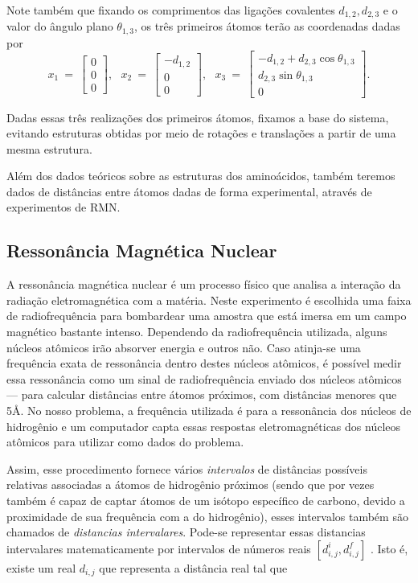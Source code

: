 \documentclass[a4paper,12pt]{article}
\begin{document}
	Note também que fixando os comprimentos das ligações covalentes $d_{1,2},d_{2,3}$ e o valor do ângulo plano $\theta_{1,3}$, os três primeiros átomos terão as coordenadas dadas por
	$$
	x_1\:=\:
	\begin{bmatrix}
	0\\ 
	0\\  
	0
	\end{bmatrix},\:\:\:
	x_2\:=\:
	\begin{bmatrix}
	-d_{1,2}\\ 
	0\\  
	0
	\end{bmatrix},\:\:\:
	x_3\:=\:
	\begin{bmatrix}
	-d_{1,2}+d_{2,3}\cos\theta_{1,3}\\ 
	d_{2,3}\sin\theta_{1,3}\\  
	0
	\end{bmatrix}.
	$$
	
	Dadas essas três realizações dos primeiros átomos, fixamos a base do sistema, evitando estruturas obtidas por meio de rotações e translações a partir de uma mesma estrutura.	
	
	Além dos dados teóricos sobre as estruturas dos aminoácidos, também teremos dados de distâncias entre átomos dadas de forma experimental, através de experimentos de RMN.
	
	\subsection{Ressonância Magnética Nuclear}
	A ressonância magnética nuclear é um processo físico que analisa a interação da radiação eletromagnética com a matéria. Neste experimento é escolhida uma faixa de radiofrequência para bombardear uma amostra que está imersa em um campo magnético bastante intenso. Dependendo da radiofrequência utilizada, alguns núcleos atômicos irão absorver energia e outros não. Caso atinja-se uma frequência exata de ressonância dentro destes núcleos atômicos, é possível medir essa ressonância como um sinal de radiofrequência enviado dos núcleos atômicos --- para calcular distâncias entre átomos próximos, com distâncias menores que 5\AA. No nosso problema, a frequência utilizada é para a ressonância dos núcleos de hidrogênio e um computador capta essas respostas eletromagnéticas dos núcleos atômicos para utilizar como dados do problema. \cite{RMNBookIntroduction}
	
	Assim, esse procedimento fornece vários \textit{intervalos} de distâncias possíveis relativas associadas a átomos de hidrogênio próximos (sendo que por vezes também 
	é capaz de captar átomos de um isótopo específico de carbono, devido a proximidade de sua frequência com a do hidrogênio), esses intervalos também são chamados de \textit{distancias intervalares}. Pode-se representar essas distancias intervalares matematicamente por intervalos de números reais $[d_{i,j}^i, d_{i,j}^f]$ . Isto é, existe um real $d_{i,j}$ que representa a distância real tal que
	
\end{document}
